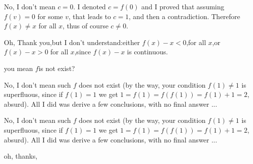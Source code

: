 \begin{solution}
	\begin{tcolorbox}No, I don't mean $c=0$. I denoted $c=f(0)$ and I proved that assuming $f(v) = 0$ for some $v$, that leads to $c=1$, and then a contradiction. Therefore $f(x)\neq x$ for all $x$, thus of course $c\neq 0$.\end{tcolorbox}


Oh, Thank you,but I don't understand:either $f(x)-x<0$,for all $x$,or $f(x)-x>0$ for all $x$,since $f(x)-x$ is continuous.

you mean $f$is not exist?
\end{solution}



\begin{solution}
	No, I don't mean such $f$ does not exist (by the way, your condition $f(1) \neq 1$ is superfluous, since if $f(1) = 1$ we get $1 = f(1) = f(f(1)) = f(1)+1 = 2$, absurd). All I did was derive a few conclusions, with no final answer ...
\end{solution}



\begin{solution}
	\begin{tcolorbox}No, I don't mean such $f$ does not exist (by the way, your condition $f(1) \neq 1$ is superfluous, since if $f(1) = 1$ we get $1 = f(1) = f(f(1)) = f(1)+1 = 2$, absurd). All I did was derive a few conclusions, with no final answer ...\end{tcolorbox}

oh, thanks,
\end{solution}



